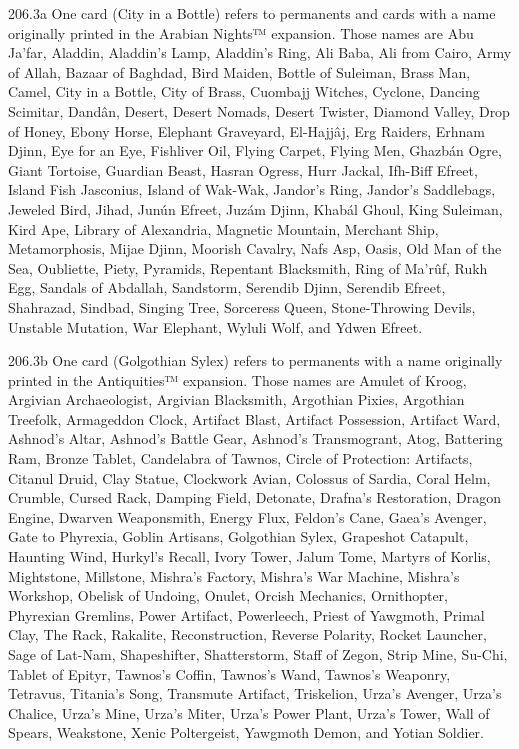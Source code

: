 206.3a One card (City in a Bottle) refers to permanents and cards with a name originally printed in the Arabian Nights™ expansion. Those names are Abu Ja’far, Aladdin, Aladdin’s Lamp, Aladdin’s Ring, Ali Baba, Ali from Cairo, Army of Allah, Bazaar of Baghdad, Bird Maiden, Bottle of Suleiman, Brass Man, Camel, City in a Bottle, City of Brass, Cuombajj Witches, Cyclone, Dancing Scimitar, Dandân, Desert, Desert Nomads, Desert Twister, Diamond Valley, Drop of Honey, Ebony Horse, Elephant Graveyard, El-Hajjâj, Erg Raiders, Erhnam Djinn, Eye for an Eye, Fishliver Oil, Flying Carpet, Flying Men, Ghazbán Ogre, Giant Tortoise, Guardian Beast, Hasran Ogress, Hurr Jackal, Ifh-Biff Efreet, Island Fish Jasconius, Island of Wak-Wak, Jandor’s Ring, Jandor’s Saddlebags, Jeweled Bird, Jihad, Junún Efreet, Juzám Djinn, Khabál Ghoul, King Suleiman, Kird Ape, Library of Alexandria, Magnetic Mountain, Merchant Ship, Metamorphosis, Mijae Djinn, Moorish Cavalry, Nafs Asp, Oasis, Old Man of the Sea, Oubliette, Piety, Pyramids, Repentant Blacksmith, Ring of Ma’rûf, Rukh Egg, Sandals of Abdallah, Sandstorm, Serendib Djinn, Serendib Efreet, Shahrazad, Sindbad, Singing Tree, Sorceress Queen, Stone-Throwing Devils, Unstable Mutation, War Elephant, Wyluli Wolf, and Ydwen Efreet.

206.3b One card (Golgothian Sylex) refers to permanents with a name originally printed in the Antiquities™ expansion. Those names are Amulet of Kroog, Argivian Archaeologist, Argivian Blacksmith, Argothian Pixies, Argothian Treefolk, Armageddon Clock, Artifact Blast, Artifact Possession, Artifact Ward, Ashnod’s Altar, Ashnod’s Battle Gear, Ashnod’s Transmogrant, Atog, Battering Ram, Bronze Tablet, Candelabra of Tawnos, Circle of Protection: Artifacts, Citanul Druid, Clay Statue, Clockwork Avian, Colossus of Sardia, Coral Helm, Crumble, Cursed Rack, Damping Field, Detonate, Drafna’s Restoration, Dragon Engine, Dwarven Weaponsmith, Energy Flux, Feldon’s Cane, Gaea’s Avenger, Gate to Phyrexia, Goblin Artisans, Golgothian Sylex, Grapeshot Catapult, Haunting Wind, Hurkyl’s Recall, Ivory Tower, Jalum Tome, Martyrs of Korlis, Mightstone, Millstone, Mishra’s Factory, Mishra’s War Machine, Mishra’s Workshop, Obelisk of Undoing, Onulet, Orcish Mechanics, Ornithopter, Phyrexian Gremlins, Power Artifact, Powerleech, Priest of Yawgmoth, Primal Clay, The Rack, Rakalite, Reconstruction, Reverse Polarity, Rocket Launcher, Sage of Lat-Nam, Shapeshifter, Shatterstorm, Staff of Zegon, Strip Mine, Su-Chi, Tablet of Epityr, Tawnos’s Coffin, Tawnos’s Wand, Tawnos’s Weaponry, Tetravus, Titania’s Song, Transmute Artifact, Triskelion, Urza’s Avenger, Urza’s Chalice, Urza’s Mine, Urza’s Miter, Urza’s Power Plant, Urza’s Tower, Wall of Spears, Weakstone, Xenic Poltergeist, Yawgmoth Demon, and Yotian Soldier.

